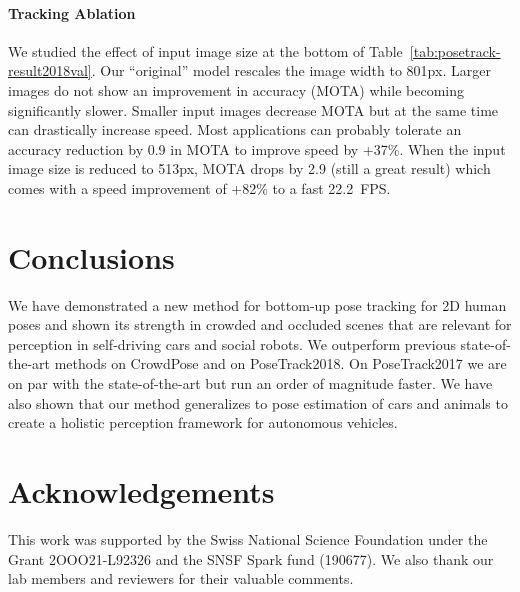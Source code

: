 \documentclass[journal]{IEEEtran}
\newcommand{\hl}[1]{#1}
\begin{document}
\paragraph{Tracking Ablation}

We studied the effect of input image size at the bottom
of Table~\ref{tab:posetrack-result2018val}.
Our ``original'' model rescales the image width to 801px.
Larger images do not show an improvement in accuracy (MOTA) while
becoming significantly slower. Smaller input images
decrease MOTA but at the same time can drastically increase
speed. Most applications can probably tolerate an accuracy
reduction by \hl{0.9} in MOTA to improve speed by +37\%. When the
input image size is reduced to 513px, MOTA drops by \hl{2.9} (still a
great result) which comes with a speed improvement of +82\% to
a fast 22.2~FPS.









\section{Conclusions}


We have demonstrated a new method for bottom-up pose tracking for 2D human poses
and shown its strength in crowded and occluded scenes that are relevant for
perception in self-driving cars and social robots. We outperform previous
state-of-the-art methods on CrowdPose and on PoseTrack2018. On PoseTrack2017
we are on par with the state-of-the-art but run an order of magnitude faster.
We have also
shown that our method generalizes to pose estimation of cars and animals
to create a holistic perception framework for autonomous vehicles.


\section{Acknowledgements}

This work was supported by the Swiss National Science Foundation under the Grant 2OOO21-L92326 and the SNSF Spark fund (190677). We also thank our lab members and reviewers for their valuable comments.
\end{document}
